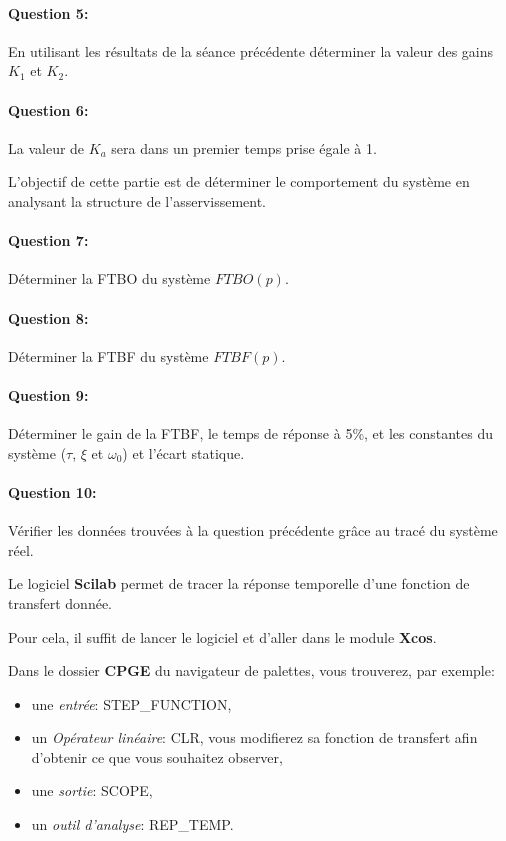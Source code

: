 \paragraph{Question 5:} En utilisant les résultats de la séance précédente déterminer la valeur des gains $K_1$ et $K_2$.

\paragraph{Question 6:} La valeur de $K_a$ sera dans un premier temps prise égale à 1.

\ifdef{\public}{\cleardoublepage}{}


L'objectif de cette partie est de déterminer le comportement du système en analysant la structure de l'asservissement.
~\

\paragraph{Question 7:} Déterminer la FTBO du système $FTBO(p)$.

\paragraph{Question 8:} Déterminer la FTBF du système $FTBF(p)$.

\paragraph{Question 9:} Déterminer le gain de la FTBF, le temps de réponse à 5\%, et les constantes du système ($\tau$, $\xi$ et $\omega_0$) et l'écart statique.

\paragraph{Question 10:} Vérifier les données trouvées à la question précédente grâce au tracé du système réel.
 
\ifdef{\public}{\cleardoublepage}{}


Le logiciel \textbf{Scilab} permet de tracer la réponse temporelle d'une fonction de transfert donnée.

Pour cela, il suffit de lancer le logiciel et d'aller dans le module \textbf{Xcos}.

Dans le dossier \textbf{CPGE} du navigateur de palettes, vous trouverez, par exemple:
\begin{itemize}
 \item une \textit{entrée}: STEP\_FUNCTION,
 \item un \textit{Opérateur linéaire}: CLR, vous modifierez sa fonction de transfert afin d'obtenir ce que vous souhaitez observer,
 \item une \textit{sortie}: SCOPE,
 \item un \textit{outil d'analyse}: REP\_TEMP.
\end{itemize}

